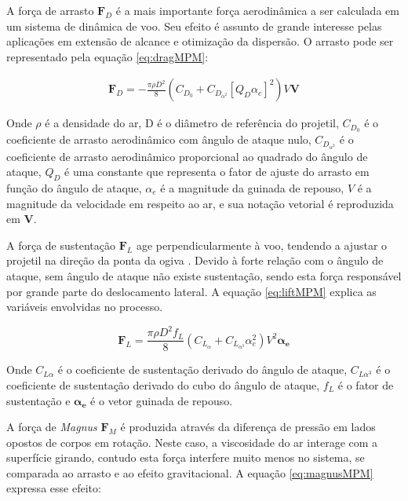 A força de arrasto \(\boldsymbol{F}_{D}\) é a mais importante força aerodinâmica a ser calculada em um sistema de dinâmica de voo. Seu efeito é assunto de grande interesse pelas aplicações em extensão de alcance e otimização da dispersão. O arrasto pode ser representado pela equação \ref{eq:dragMPM}:

\begin{gather}
    \label{eq:dragMPM}
    \boldsymbol{F}_{D} = -\frac{\pi \rho D^{2}}{8} (C_{D_{0}} + C_{D_{\alpha^{2}}} [Q_{D}\alpha_{e}]^{2})V\boldsymbol{V}
\end{gather}

Onde \(\rho\) é a densidade do ar, D é o diâmetro de referência do projetil, \(C_{D_{0}}\) é o coeficiente de arrasto aerodinâmico com ângulo de ataque nulo, \(C_{D_{\alpha^{2}}}\) é o coeficiente de arrasto aerodinâmico proporcional ao quadrado do ângulo de ataque, \(Q_{D}\) é uma constante que representa o fator de ajuste do arrasto em função do ângulo de ataque, \(\alpha_{e}\) é a magnitude da guinada de repouso, \(V\) é a magnitude da velocidade em respeito ao ar, e sua notação vetorial é reproduzida em \(\boldsymbol{V}\).

A força de sustentação \(\boldsymbol{F}_{L}\) age perpendicularmente à voo, tendendo a ajustar o projetil na direção da ponta da ogiva \cite{McCoy2012}. Devido à forte relação com o ângulo de ataque, sem ângulo de ataque não existe sustentação, sendo esta força responsável por grande parte do deslocamento lateral. A equação \ref{eq:liftMPM} explica as variáveis envolvidas no processo.

\begin{equation}
    \label{eq:liftMPM}
    \boldsymbol{F}_{L} = \frac{\pi \rho D^{2} f_{L}}{8} (C_{L_{\alpha}}+C_{L_{\alpha^3}}\alpha_{e}^{2})V^{2} \boldsymbol{\alpha_{e}}
\end{equation}

Onde \(C_{L\alpha}\) é o coeficiente de sustentação derivado do ângulo de ataque, \(C_{L\alpha^{3}}\) é o coeficiente de sustentação derivado do cubo do ângulo de ataque, \(f_{L}\) é o fator de sustentação e \(\boldsymbol{\alpha_{e}}\) é o vetor guinada de repouso.

A força de \textit{Magnus} \(\boldsymbol{F}_{M}\) é produzida através da diferença de pressão em lados opostos de corpos em rotação. Neste caso, a viscosidade do ar interage com a superfície girando, contudo esta força interfere muito menos no sistema, se comparada ao arrasto e ao efeito gravitacional. A equação \ref{eq:magnusMPM} expressa esse efeito: 

